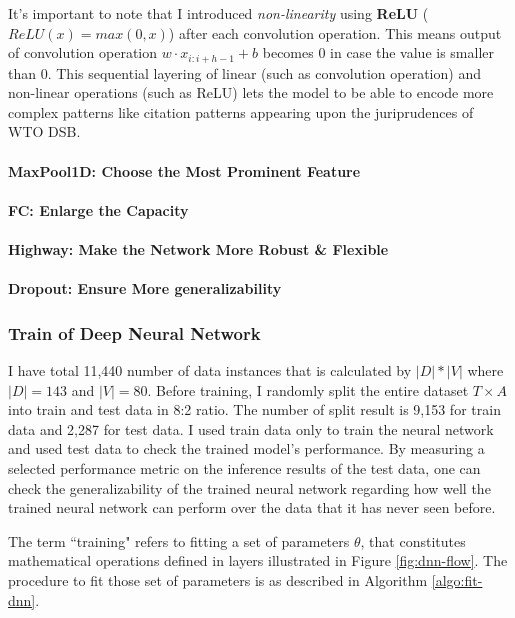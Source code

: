 \documentclass[12pt,letterpaper]{article}
\begin{document}
It's important to note that I introduced \textit{non-linearity} using \textbf{ReLU} ($ReLU(x) = max(0, x)$) after each convolution operation.
This means output of convolution operation $w \cdot x_{i:i+h-1} + b$ becomes $0$ in case the value is smaller than $0$.
This sequential layering of linear (such as convolution operation) and non-linear operations (such as ReLU) lets the model to be able to encode 
more complex patterns like citation patterns appearing upon the juriprudences of WTO DSB.

\paragraph{MaxPool1D: Choose the Most Prominent Feature}

\paragraph{FC: Enlarge the Capacity}

\paragraph{Highway: Make the Network More Robust \& Flexible}

\paragraph{Dropout: Ensure More generalizability}



\subsubsection{Train of Deep Neural Network}
I have total 11,440 number of data instances that is calculated by $|D| * |V|$ where $|D| = 143$ and $|V|=80$.
Before training, I randomly split the entire dataset $T \times A$ into train and test data in 8:2 ratio.
The number of split result is 9,153 for train data and 2,287 for test data.
I used train data only to train the neural network and used test data to check the trained model's performance.
By measuring a selected performance
metric on the inference results of the test data, one can check the generalizability of the trained neural network regarding
how well the trained neural network can perform over the data that it has never seen before.

The term ``training" refers to fitting a set of parameters $\theta$,
that constitutes mathematical operations defined in layers illustrated in Figure \ref{fig:dnn-flow}.
The procedure to fit those set of parameters is as described in Algorithm \ref{algo:fit-dnn}.
\end{document}
